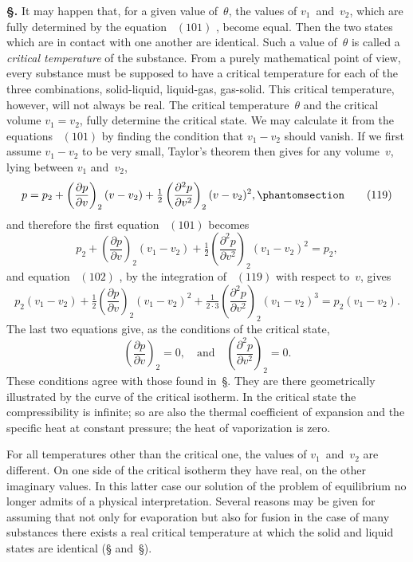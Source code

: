 \documentclass[12pt]{book}[2005/09/16]
\newcommand{\Chg}[2]{#2}
\newcommand{\Add}[1]{\Chg{}{#1}}
\newcommand{\Section}[1]{
  \medskip\par\textbf{§\;#1}
  \label{section:#1}
}
\newcommand{\SecRef}[2][§\;]{\hyperref[section:#2.]{{\upshape #1#2}}}
\newcommand{\Tag}[1]{%
  \phantomsection\label{eqn:#1}\tag*{\ensuremath{#1}}%
}
\newcommand{\Eq}[1]{%
  \hyperref[eqn:#1]{\ensuremath{#1}}%
}
\newcommand{\PageSep}[1]{\ignorespaces}
\newcommand{\dd}{\partial}
\begin{document}
\Section{185.} It may happen that, for a given value of~$\theta$, the
%
values of $v_{1}$~and~$v_{2}$, which are fully determined by the
equation~\Eq{(101)}, become equal. Then the two states which are
in contact with one another are identical. Such a value of~$\theta$
is called a \emph{critical temperature} of the substance. From a
%
purely mathematical point of view, every substance must
be supposed to have a critical temperature for each of the
three combinations, solid-liquid, liquid-gas, gas-solid. This
critical temperature, however, will not always be real. The
critical temperature~$\theta$ and the critical volume $v_{1} = v_{2}$, fully
determine the critical state. We may calculate it from the
equations~\Eq{(101)} by finding the condition that $v_{1} - v_{2}$ should
vanish. If we first assume $v_{1} - v_{2}$ to be very small, Taylor's
theorem then gives for any volume~$v$, lying between $v_{1}$
and~$v_{2}$,
\[
p = p_{2} + \left(\frac{\dd p}{\dd v}\right)_{2} (v - v_{2}) + \tfrac{1}{2} \left(\frac{\dd^{2} p}{\dd v^{2}}\right)_{2} (v - v_{2})^{2}\Add{,}
\Tag{(119)}
\]
and therefore the first equation~\Eq{(101)} becomes
\[
p_{2} + \left(\frac{\dd p}{\dd v}\right)_{2} (v_{1} - v_{2}) + \tfrac{1}{2} \left(\frac{\dd^{2} p}{\dd v^{2}}\right)_{2} (v_{1} - v_{2})^{2} = p_{2},
\]
and equation~\Eq{(102)}, by the integration of~\Eq{(119)} with respect
to~$v$, gives
\[
p_{2} (v_{1} - v_{2})
  + \tfrac{1}{2} \left(\frac{\dd p}{\dd v}\right)_{2}\!\!\! (v_{1} - v_{2})^{2}
  + \tfrac{1}{2 · 3} \left(\frac{\dd^{2} p}{\dd v^{2}}\right)_{2}\!\!\! (v_{1} - v_{2})^{3}
  = p_{2} (v_{1} - v_{2}).
\]
\PageSep{153}
The last two equations give, as the conditions of the critical
state,
\[
\left(\frac{\dd p}{\dd v}\right)_{2} = 0,\quad\text{and}\quad
\left(\frac{\dd^{2} p}{\dd v^{2}}\right)_{2} = 0.
\]
These conditions agree with those found in~\SecRef{30}. They are
there geometrically illustrated by the curve of the critical
isotherm. In the critical state the compressibility is infinite;
so are also the thermal coefficient of expansion and the
specific heat at constant pressure; the heat of vaporization
is zero.

For all temperatures other than the critical one, the
values of $v_{1}$~and~$v_{2}$ are different. On one side of the critical
isotherm they have real, on the other imaginary values.
In this latter case our solution of the problem of equilibrium
no longer admits of a physical interpretation. Several
reasons may be given for assuming that not only for
evaporation but also for fusion in the case of many substances
there exists a real critical temperature at which the
solid and liquid states are identical (\SecRef{31} and~\SecRef{191}).
\end{document}
